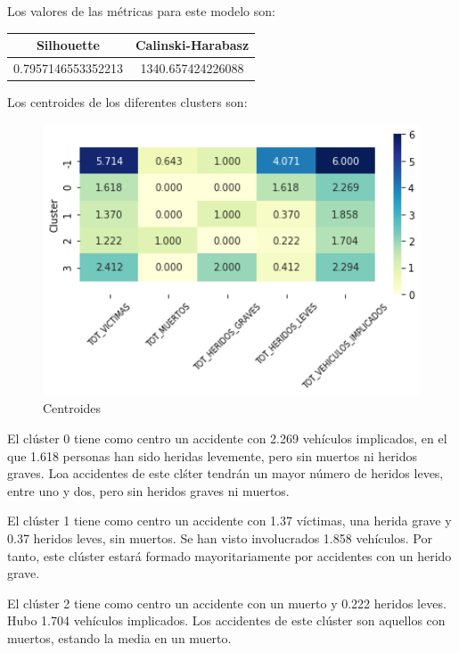 \documentclass[a4]{article}
\begin{document}
Los valores de las métricas para este modelo son:

\begin{center}
\begin{tabular}{|c|c|}
\hline
\multicolumn{1}{|c|}{\textbf{Silhouette}} & \textbf{Calinski-Harabasz}\\ \hline
  0.7957146553352213 & 1340.657424226088  \\ \hline
\end{tabular}
\end{center}

Los centroides de los diferentes clusters son:

\begin{figure}[H]
  \centering
  \caption{Centroides}
  \includegraphics[width=130mm]{imagenes/c3_dbscan_centroides}
\end{figure}

El clúster 0 tiene como centro un accidente con 2.269 vehículos implicados, en el que 1.618 personas han sido heridas levemente, pero sin muertos ni heridos graves. Loa accidentes de este clśter tendrán un mayor número de heridos leves, entre uno y dos, pero sin heridos graves ni muertos.

El clúster 1 tiene como centro un accidente con 1.37 víctimas, una herida grave y 0.37 heridos leves, sin muertos. Se han visto involucrados 1.858 vehículos. Por tanto, este clúster estará formado mayoritariamente por accidentes con un herido grave.

El clúster 2 tiene como centro un accidente con un muerto y 0.222 heridos leves. Hubo 1.704 vehículos implicados. Los accidentes de este clúster son aquellos con muertos, estando la media en un muerto.
\end{document}
